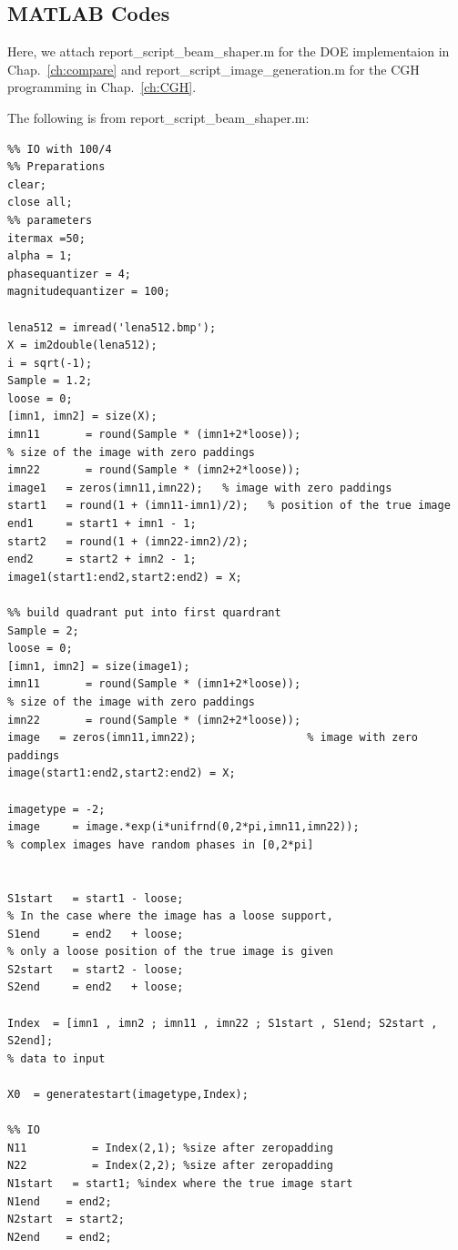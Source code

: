 \documentclass[letter,14pt]{extreport}
\begin{document}

\begin{appendices}
\chapter{MATLAB Codes}
\label{ch:codes}
\singlespacing

Here, we attach report\_script\_beam\_shaper.m for the DOE
implementaion in Chap.~\ref{ch:compare} and report\_script\_image\_generation.m
for the CGH programming in Chap.~\ref{ch:CGH}.

The following is from report\_script\_beam\_shaper.m:


\begin{lstlisting} 
%% IO with 100/4
%% Preparations
clear;
close all;
%% parameters
itermax =50;
alpha = 1;
phasequantizer = 4;
magnitudequantizer = 100;

lena512 = imread('lena512.bmp');
X = im2double(lena512);
i = sqrt(-1);
Sample = 1.2;
loose = 0;
[imn1, imn2] = size(X);
imn11       = round(Sample * (imn1+2*loose));
% size of the image with zero paddings
imn22       = round(Sample * (imn2+2*loose));
image1   = zeros(imn11,imn22);   % image with zero paddings
start1   = round(1 + (imn11-imn1)/2);   % position of the true image
end1     = start1 + imn1 - 1;
start2   = round(1 + (imn22-imn2)/2);
end2     = start2 + imn2 - 1;
image1(start1:end2,start2:end2) = X;

%% build quadrant put into first quardrant
Sample = 2;
loose = 0;
[imn1, imn2] = size(image1);
imn11       = round(Sample * (imn1+2*loose));
% size of the image with zero paddings
imn22       = round(Sample * (imn2+2*loose));
image   = zeros(imn11,imn22);                 % image with zero paddings
image(start1:end2,start2:end2) = X;

imagetype = -2;
image     = image.*exp(i*unifrnd(0,2*pi,imn11,imn22));
% complex images have random phases in [0,2*pi]


S1start   = start1 - loose;
% In the case where the image has a loose support,
S1end     = end2   + loose;
% only a loose position of the true image is given
S2start   = start2 - loose;
S2end     = end2   + loose;

Index  = [imn1 , imn2 ; imn11 , imn22 ; S1start , S1end; S2start , S2end];
% data to input

X0  = generatestart(imagetype,Index);

%% IO  
N11          = Index(2,1); %size after zeropadding
N22          = Index(2,2); %size after zeropadding
N1start   = start1; %index where the true image start
N1end    = end2;
N2start  = start2;
N2end    = end2;


\end{lstlisting}
\end{appendices}
\end{document}
